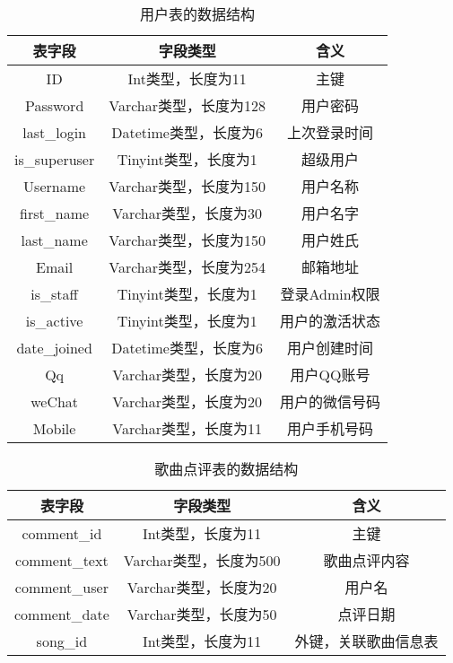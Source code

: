 \documentclass[UTF8,14pt]{article}
\numberwithin{figure}{subsubsection}
\numberwithin{table}{subsubsection}
\begin{document}
\begin{table}[H]
	\centering
	\setlength{\abovecaptionskip}{0.cm}
	\setlength{\belowcaptionskip}{0.cm}
	\begin{tabular}{|c|c|c|}
		\hline
		表字段        & 字段类型               & 含义           \\ \hline
		ID            & Int类型，长度为11      & 主键           \\ \hline
		Password      & Varchar类型，长度为128 & 用户密码       \\ \hline
		last\_login   & Datetime类型，长度为6  & 上次登录时间   \\ \hline
		is\_superuser & Tinyint类型，长度为1   & 超级用户       \\ \hline
		Username      & Varchar类型，长度为150 & 用户名称       \\ \hline
		first\_name   & Varchar类型，长度为30  & 用户名字       \\ \hline
		last\_name    & Varchar类型，长度为150 & 用户姓氏       \\ \hline
		Email         & Varchar类型，长度为254 & 邮箱地址       \\ \hline
		is\_staff     & Tinyint类型，长度为1   & 登录Admin权限  \\ \hline
		is\_active    & Tinyint类型，长度为1   & 用户的激活状态 \\ \hline
		date\_joined  & Datetime类型，长度为6  & 用户创建时间   \\ \hline
		Qq            & Varchar类型，长度为20  & 用户QQ账号     \\ \hline
		weChat        & Varchar类型，长度为20  & 用户的微信号码 \\ \hline
		Mobile        & Varchar类型，长度为11  & 用户手机号码   \\ \hline
	\end{tabular}
	\caption{用户表的数据结构}
\end{table}
\vspace{-0.5cm}
\begin{table}[H]
	\centering
	\setlength{\abovecaptionskip}{0.cm}
	\setlength{\belowcaptionskip}{0.cm}
	\begin{tabular}{|c|c|c|}
		\hline
		表字段        & 字段类型               & 含义                 \\ \hline
		comment\_id   & Int类型，长度为11      & 主键                 \\ \hline
		comment\_text & Varchar类型，长度为500 & 歌曲点评内容         \\ \hline
		comment\_user & Varchar类型，长度为20  & 用户名               \\ \hline
		comment\_date & Varchar类型，长度为50  & 点评日期             \\ \hline
		song\_id      & Int类型，长度为11      & 外键，关联歌曲信息表 \\ \hline
	\end{tabular}
	\caption{歌曲点评表的数据结构}
\end{table}
\end{document}
